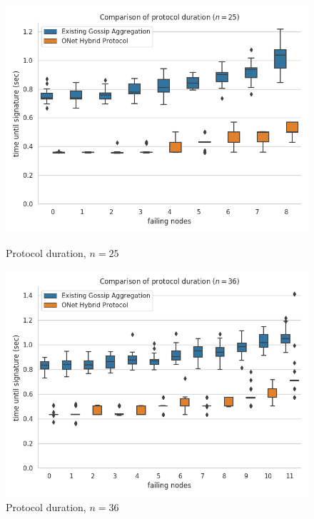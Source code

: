 \begin{figure}[H]
    \centering
    \begin{minipage}{0.5\textwidth}
        \centering
        \includegraphics[width=\textwidth]{images/round_wall_sum_25.png}
        \captionsetup{labelformat=empty}
        \caption{Protocol duration, $n = 25$}
    \end{minipage}\hfill
    \begin{minipage}{0.5\textwidth}
        \centering
        \includegraphics[width=\textwidth]{images/round_wall_sum_36.png}
        \captionsetup{labelformat=empty}
        \caption{Protocol duration, $n = 36$}
    \end{minipage}\hfill
\end{figure}


